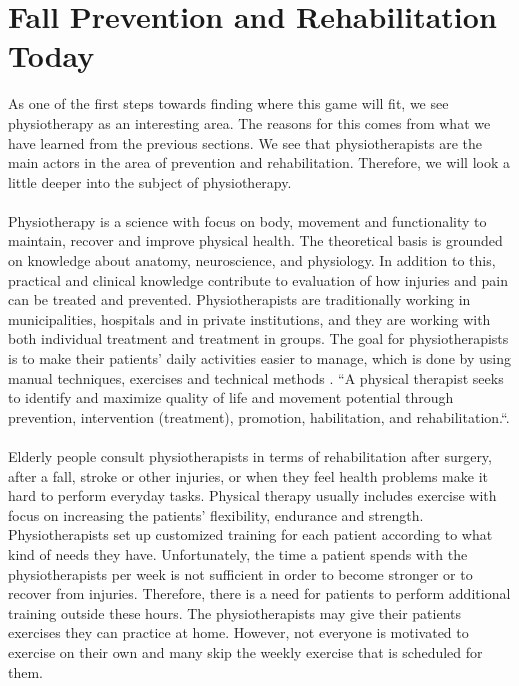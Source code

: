 \section{Fall Prevention and Rehabilitation Today}
As one of the first steps towards finding where this game will fit, we see physiotherapy as an interesting area. The reasons for this comes from what we have learned from the previous sections. We see that physiotherapists are the main actors in the area of prevention and rehabilitation. Therefore, we will look a little deeper into the subject of physiotherapy. \\ \\
Physiotherapy is a science with focus on body, movement and functionality to maintain, recover and improve physical health. The theoretical basis is grounded on knowledge about anatomy, neuroscience, and physiology. In addition to this, practical and clinical knowledge contribute to evaluation of how injuries and pain can be treated and prevented. Physiotherapists are traditionally working in municipalities, hospitals and in private institutions, and they are working with both individual treatment and treatment in groups. The goal for physiotherapists is to make their patients' daily activities easier to manage, which is done by using manual techniques, exercises and technical methods \cite{physiotherapy1}\cite{physiotherapy2}. “A physical therapist seeks to identify and maximize quality of life and movement potential through prevention, intervention (treatment), promotion, habilitation, and rehabilitation.“.\\ \\
Elderly people consult physiotherapists in terms of rehabilitation after surgery, after a fall, stroke or other injuries, or when they feel health problems make it hard to perform everyday tasks. Physical therapy usually includes exercise with focus on increasing the patients’ flexibility, endurance and strength. Physiotherapists set up customized training for each patient according to what kind of needs they have. Unfortunately, the time a patient spends with the physiotherapists per week is not sufficient in order to become stronger or to recover from injuries. Therefore, there is a need for patients to perform additional training outside these hours. The physiotherapists may give their patients exercises they can practice at home. However, not everyone is motivated to exercise on their own and many skip the weekly exercise that is scheduled for them. \cite{physiotherapy2} 


